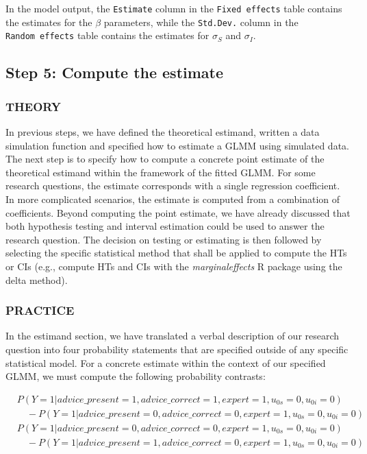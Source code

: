 \documentclass[
  man,
  floatsintext,
  longtable,
  a4paper,
  nolmodern,
  notxfonts,
  notimes,
  colorlinks=true,linkcolor=blue,citecolor=blue,urlcolor=blue]{apa7}
\begin{document}
In the model output, the \texttt{Estimate} column in the
\texttt{Fixed\ effects} table contains the estimates for the \(\beta\)
parameters, while the \texttt{Std.Dev.} column in the
\texttt{Random\ effects} table contains the estimates for \(\sigma_S\)
and \(\sigma_I\).

\subsection{Step 5: Compute the
estimate}\label{step-5-compute-the-estimate}

\subsubsection{THEORY}\label{theory-7}

In previous steps, we have defined the theoretical estimand, written a
data simulation function and specified how to estimate a GLMM using
simulated data. The next step is to specify how to compute a concrete
point estimate of the theoretical estimand within the framework of the
fitted GLMM. For some research questions, the estimate corresponds with
a single regression coefficient. In more complicated scenarios, the
estimate is computed from a combination of coefficients. Beyond
computing the point estimate, we have already discussed that both
hypothesis testing and interval estimation could be used to answer the
research question. The decision on testing or estimating is then
followed by selecting the specific statistical method that shall be
applied to compute the HTs or CIs (e.g., compute HTs and CIs with the
\emph{marginaleffects} R package using the delta method).

\subsubsection{PRACTICE}\label{practice-7}

In the estimand section, we have translated a verbal description of our
research question into four probability statements that are specified
outside of any specific statistical model. For a concrete estimate
within the context of our specified GLMM, we must compute the following
probability contrasts:

\[
\begin{aligned}
& P(Y=1|advice\_present = 1, advice\_correct = 1, expert = 1, u_{0s} = 0, u_{0i} = 0) \\
& \quad - P(Y=1|advice\_present = 0, advice\_correct = 0, expert = 1, u_{0s} = 0, u_{0i} = 0)
\end{aligned}
\] \[
\begin{aligned}
& P(Y=1|advice\_present = 0, advice\_correct = 0, expert = 1, u_{0s} = 0, u_{0i} = 0) \\
& \quad - P(Y=1|advice\_present = 1, advice\_correct = 0, expert = 1, u_{0s} = 0, u_{0i} = 0)
\end{aligned}
\]
\end{document}
